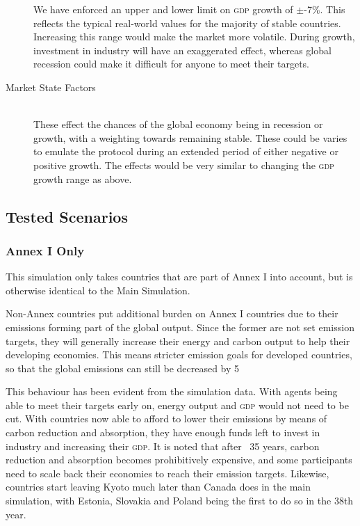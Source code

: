 \begin{description}
We have enforced an upper and lower limit on \textsc{gdp} growth of $\pm$-7\%. This reflects the typical real-world values for the majority of stable countries. Increasing this range would make the market more volatile. During growth, investment in industry will have an exaggerated effect, whereas global recession could make it difficult for anyone to meet their targets.

\item[Market State Factors] \hfill \\

These effect the chances of the global economy being in recession or growth, with a weighting towards remaining stable. These could be varies to emulate the protocol during an extended period of either negative or positive growth. The effects would be very similar to changing the \textsc{gdp} growth range as above.
\end{description}

\subsection{Tested Scenarios}

%
%

\subsubsection{Annex I Only}

This simulation only takes countries that are part of Annex I into account, but is otherwise identical to the Main Simulation.

Non-Annex countries put additional burden on Annex I countries due to their emissions forming part of the global output. Since the former are not set emission targets, they will generally increase their energy and carbon output to help their developing economies. This means stricter emission goals for developed countries, so that the global emissions can still be decreased by 5%

This behaviour has been evident from the simulation data. With agents being able to meet their targets early on, energy output and \textsc{gdp} would not need to be cut. With countries now able to afford to lower their emissions by means of carbon reduction and absorption, they have enough funds left to invest in industry and increasing their \textsc{gdp}. It is noted that after ~35 years, carbon reduction and absorption becomes prohibitively expensive, and some participants need to scale back their economies to reach their emission targets. Likewise, countries start leaving Kyoto much later than Canada does in the main simulation, with Estonia, Slovakia and Poland being the first to do so in the 38th year.


